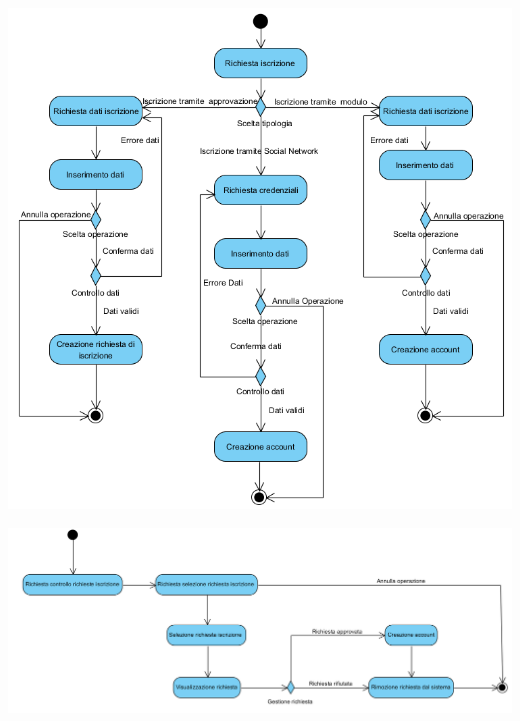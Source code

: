 \begin{center}
	\includegraphics[width=\textwidth]{assets/visualParadigm/attivita/iscrizioni}
\end{center}

\begin{center}
	\includegraphics[width=\textwidth]{assets/visualParadigm/attivita/approvazioneIscrizione}
\end{center}

